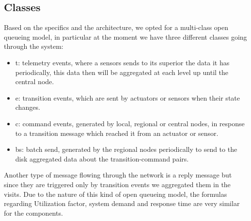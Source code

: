 \documentclass[11pt]{article}
\begin{document}
\subsection{Classes}
Based on the specifics and the architecture, we opted for a multi-class open queueing model, in particular at the moment we have three different classes going through the system:
\begin{itemize}
\item t: telemetry events, where a sensors sends to its superior the data it has periodically, this data then will be aggregated at each level up until the central node.
\item e: transition events, which are sent by actuators or sensors when their state changes.
\item c: command events, generated by local, regional or central nodes, in response to a transition message which reached it from an actuator or sensor.
\item bs: batch send, generated by the regional nodes periodically to send to the disk aggregated data about the transition-command pairs.
\end{itemize}
Another type of message flowing through the network is a reply message but since they are triggered only by transition events we aggregated them in the visits.
Due to the nature of this kind of open queueing model, the formulas regarding Utilization factor, system demand and response time are very similar for the components.
\end{document}
